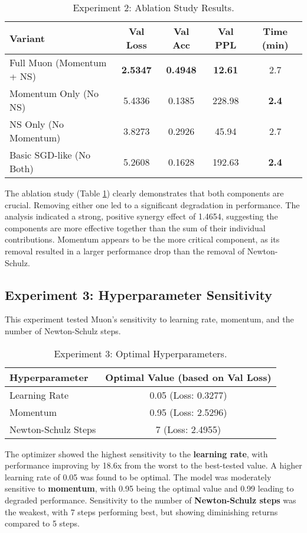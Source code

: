 \documentclass[11pt, a4paper]{article}
\begin{document}
\begin{table}[h!]
\centering
\caption{Experiment 2: Ablation Study Results.}
\label{tab:exp2}
\begin{tabular}{@{}lcccc@{}}
\toprule
Variant & Val Loss & Val Acc & Val PPL & Time (min) \\ \midrule
Full Muon (Momentum + NS) & \textbf{2.5347} & \textbf{0.4948} & \textbf{12.61} & 2.7 \\
Momentum Only (No NS) & 5.4336 & 0.1385 & 228.98 & \textbf{2.4} \\
NS Only (No Momentum) & 3.8273 & 0.2926 & 45.94 & 2.7 \\
Basic SGD-like (No Both) & 5.2608 & 0.1628 & 192.63 & \textbf{2.4} \\ \bottomrule
\end{tabular}
\end{table}

The ablation study (Table \ref{tab:exp2}) clearly demonstrates that both components are crucial. Removing either one led to a significant degradation in performance. The analysis indicated a strong, positive synergy effect of 1.4654, suggesting the components are more effective together than the sum of their individual contributions. Momentum appears to be the more critical component, as its removal resulted in a larger performance drop than the removal of Newton-Schulz.

\subsection{Experiment 3: Hyperparameter Sensitivity}
This experiment tested Muon's sensitivity to learning rate, momentum, and the number of Newton-Schulz steps.

\begin{table}[h!]
\centering
\caption{Experiment 3: Optimal Hyperparameters.}
\label{tab:exp3}
\begin{tabular}{@{}lc@{}}
\toprule
Hyperparameter & Optimal Value (based on Val Loss) \\ \midrule
Learning Rate & 0.05 (Loss: 0.3277) \\
Momentum & 0.95 (Loss: 2.5296) \\
Newton-Schulz Steps & 7 (Loss: 2.4955) \\ \bottomrule
\end{tabular}
\end{table}

The optimizer showed the highest sensitivity to the \textbf{learning rate}, with performance improving by 18.6x from the worst to the best-tested value. A higher learning rate of 0.05 was found to be optimal. The model was moderately sensitive to \textbf{momentum}, with 0.95 being the optimal value and 0.99 leading to degraded performance. Sensitivity to the number of \textbf{Newton-Schulz steps} was the weakest, with 7 steps performing best, but showing diminishing returns compared to 5 steps.
\end{document}
